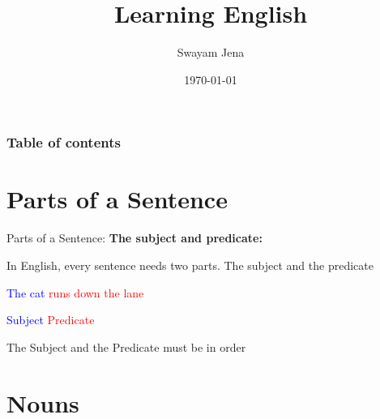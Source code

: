\documentclass{beamer}
\title[Short title]{ Learning English } %
\author{Swayam Jena} %
\institute[KT Global School] %
{
KT Global School\\ %
\medskip
}
\date{\today} %
\begin{document}
\begin{frame}
\titlepage %
\end{frame}

\begin{frame}
\frametitle{Table of contents} %
\tableofcontents %
\end{frame}



\section{Parts of a Sentence}
\begin{frame}{Parts of a Sentence:}
\centering
   \textbf{The subject and predicate:}
   \par
   \vspace{0.25in}
   In English, every sentence needs two parts. The subject and the predicate
   \par
   \vspace{0.2in}
   \textcolor{blue}{The cat} \textcolor{red}{runs down the lane}
   \par
   \vspace{0.2in}
   \textcolor{blue}{Subject}  \textcolor{red}{Predicate}
   \par
   \vspace{0.2in}
   The Subject and the Predicate must be in order
\end{frame}

\section{Nouns}
\end{document}
